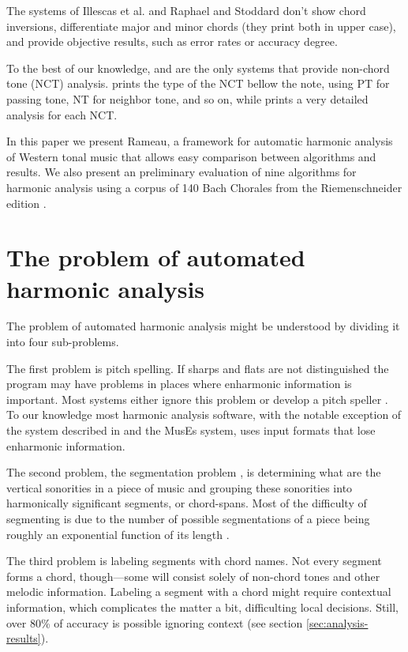 \documentclass{article}
\begin{document}
The systems of Illescas et al. \cite{illescas.ea:harmonic} and Raphael
and Stoddard \cite{raphael.ea:harmonic} don't show chord inversions,
differentiate major and minor chords (they print both in upper case),
and provide objective results, such as error rates or accuracy degree.

To the best of our knowledge, \cite{illescas.ea:harmonic} and
\cite{taube:automatic} are the only systems that provide non-chord
tone (NCT) analysis. \cite{taube:automatic} prints the type of the NCT
bellow the note, using PT for passing tone, NT for neighbor tone, and
so on, while \cite{illescas.ea:harmonic} prints a very detailed
analysis for each NCT.

In this paper we present Rameau, a framework for automatic harmonic
analysis of Western tonal music that allows easy comparison between
algorithms and results. We also present an preliminary evaluation of
nine algorithms for harmonic analysis using a corpus of 140 Bach
Chorales from the Riemenschneider edition \cite{bach:371}.

\section{The problem of automated harmonic analysis}
\label{sec:problem}

The problem of automated harmonic analysis might be understood by
dividing it into four sub-problems. 

The first problem is pitch spelling. If sharps and flats are not
distinguished the program may have problems in places where enharmonic
information is important. Most systems either ignore this problem or
develop a pitch speller \cite{temperley.ea:modeling}. To our knowledge
most harmonic analysis software, with the notable exception of the
system described in \cite{illescas.ea:harmonic} and the MusEs
\cite{pachet.ea:representing} system, uses input formats that lose
enharmonic information.

The second problem, the segmentation problem
\cite{pardo.ea:automated}, is determining what are the vertical
sonorities in a piece of music and grouping these sonorities into
harmonically significant segments, or chord-spans. Most of the
difficulty of segmenting is due to the number of possible
segmentations of a piece being roughly an exponential function of its
length \cite{pardo.ea:algorithms}.

The third problem is labeling segments with chord names. Not every
segment forms a chord, though---some will consist solely of non-chord
tones and other melodic information. Labeling a segment with a chord might
require contextual information, which complicates the matter a bit,
difficulting local decisions. Still, over 80\% of accuracy is possible
ignoring context (see section \ref{sec:analysis-results}).
\end{document}
